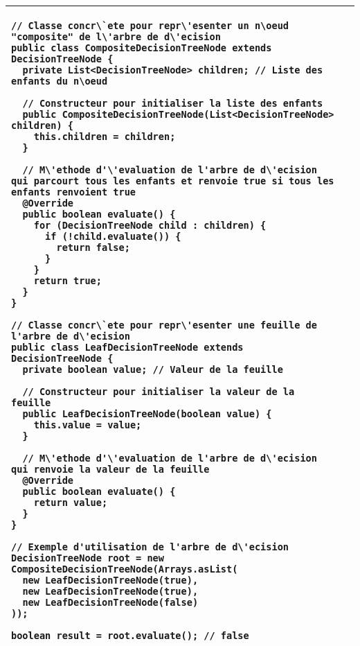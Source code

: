 \begin{table}[H]
\begin{adjustbox}{max width=\textwidth}
\begin{tabular}{l|p{\textwidth}}
\begin{minipage}[tr]{0.5\textwidth}
\begin{lstlisting}[style=monstyle]
// Classe concr\`ete pour repr\'esenter un n\oeud "composite" de l\'arbre de d\'ecision
public class CompositeDecisionTreeNode extends DecisionTreeNode {
  private List<DecisionTreeNode> children; // Liste des enfants du n\oeud

  // Constructeur pour initialiser la liste des enfants
  public CompositeDecisionTreeNode(List<DecisionTreeNode> children) {
    this.children = children;
  }

  // M\'ethode d'\'evaluation de l'arbre de d\'ecision qui parcourt tous les enfants et renvoie true si tous les enfants renvoient true
  @Override
  public boolean evaluate() {
    for (DecisionTreeNode child : children) {
      if (!child.evaluate()) {
        return false;
      }
    }
    return true;
  }
}

// Classe concr\`ete pour repr\'esenter une feuille de l'arbre de d\'ecision
public class LeafDecisionTreeNode extends DecisionTreeNode {
  private boolean value; // Valeur de la feuille

  // Constructeur pour initialiser la valeur de la feuille
  public LeafDecisionTreeNode(boolean value) {
    this.value = value;
  }

  // M\'ethode d'\'evaluation de l'arbre de d\'ecision qui renvoie la valeur de la feuille
  @Override
  public boolean evaluate() {
    return value;
  }
}

// Exemple d'utilisation de l'arbre de d\'ecision
DecisionTreeNode root = new CompositeDecisionTreeNode(Arrays.asList(
  new LeafDecisionTreeNode(true),
  new LeafDecisionTreeNode(true),
  new LeafDecisionTreeNode(false)
));

boolean result = root.evaluate(); // false
\end{lstlisting}
\end{minipage}
\\
\bottomrule
\end{tabular}
\end{adjustbox}
\end{table}